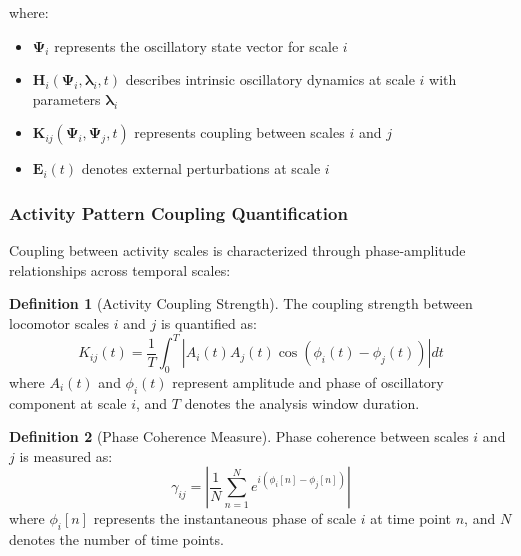 \documentclass[12pt,a4paper]{article}
\theoremstyle{definition}
\newtheorem{definition}{Definition}[section]
\begin{document}
where:
\begin{itemize}
\item $\mathbf{\Psi}_i$ represents the oscillatory state vector for scale $i$
\item $\mathbf{H}_i(\mathbf{\Psi}_i, \boldsymbol{\lambda}_i, t)$ describes intrinsic oscillatory dynamics at scale $i$ with parameters $\boldsymbol{\lambda}_i$
\item $\mathbf{K}_{ij}(\mathbf{\Psi}_i, \mathbf{\Psi}_j, t)$ represents coupling between scales $i$ and $j$
\item $\mathbf{E}_i(t)$ denotes external perturbations at scale $i$
\end{itemize}

\subsubsection{Activity Pattern Coupling Quantification}

Coupling between activity scales is characterized through phase-amplitude relationships across temporal scales:

\begin{definition}[Activity Coupling Strength]
The coupling strength between locomotor scales $i$ and $j$ is quantified as:
\begin{equation}
K_{ij}(t) = \frac{1}{T} \int_0^T \left| A_i(t) A_j(t) \cos(\phi_i(t) - \phi_j(t)) \right| dt
\label{eq:activity_coupling}
\end{equation}
where $A_i(t)$ and $\phi_i(t)$ represent amplitude and phase of oscillatory component at scale $i$, and $T$ denotes the analysis window duration.
\end{definition}

\begin{definition}[Phase Coherence Measure]
Phase coherence between scales $i$ and $j$ is measured as:
\begin{equation}
\gamma_{ij} = \left| \frac{1}{N} \sum_{n=1}^{N} e^{i(\phi_i[n] - \phi_j[n])} \right|
\end{equation}
where $\phi_i[n]$ represents the instantaneous phase of scale $i$ at time point $n$, and $N$ denotes the number of time points.
\end{definition}
\end{document}
